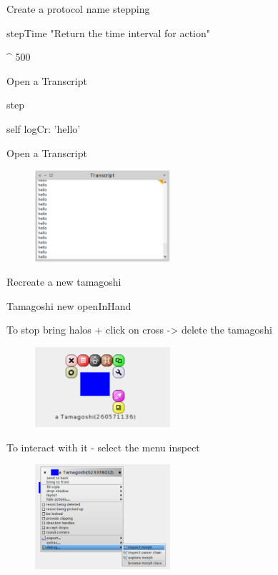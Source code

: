 \documentclass[a4paper,10pt,twoside]{book}
\begin{document}
Create a protocol name stepping


\begin{code}{}
stepTime 
	"Return the time interval for action"
	
	^ 500
\end{code}

Open a Transcript



\begin{code}{}
step

	self logCr: 'hello'
\end{code}

Open a Transcript

\begin{figure}
\begin{center}
\includegraphics[width=5cm]{figures/helloInTranscript}
\caption{\label{fig:tomastate}}
\end{center}
\end{figure}

Recreate a new tamagoshi
\begin{code}{}
Tamagoshi new openInHand
\end{code}

To stop bring halos + click on cross -> delete the tamagoshi


\begin{figure}
\begin{center}
\includegraphics[width=5cm]{figures/TamaWithHalo}
\caption{\label{fig:tomastate}}
\end{center}
\end{figure}


To interact with it
- select the menu inspect 

\begin{figure}
\begin{center}
\includegraphics[width=5cm]{figures/TamaWithInspectMenu}
\caption{\label{fig:tomastate}}
\end{center}
\end{figure}
\end{document}
